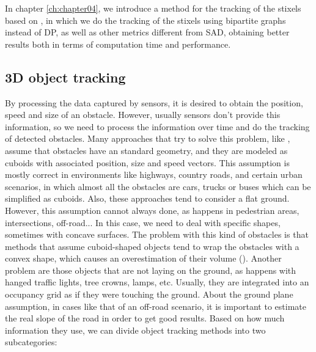 In chapter \ref{ch:chapter04}, we introduce a method for the tracking of the stixels based on \cite{gunyel2012stixels}, in which we do the tracking of the stixels using bipartite graphs instead of \ac{DP}, as well as other metrics different from \ac{SAD}, obtaining better results both in terms of computation time and performance.

\subsection{3D object tracking}\label{ch:chapter00_02_05}

By processing the data captured by sensors, it is desired to obtain the position, speed and size of an obstacle. However, usually sensors don't provide this information, so we need to process the information over time and do the tracking of detected obstacles. Many approaches that try to solve this problem, like \cite{danescu2012particle}, assume that obstacles have an standard geometry, and they are modeled as cuboids with associated position, size and speed vectors. This assumption is mostly correct in environments like highways, country roads, and certain urban scenarios, in which almost all the obstacles are cars, trucks or buses which can be simplified as cuboids. Also, these approaches tend to consider a flat ground.
However, this assumption cannot always done, as happens in pedestrian areas, intersections, off-road... In this case, we need to deal with specific shapes, sometimes with concave surfaces. The problem with this kind of obstacles is that methods that assume cuboid-shaped objects tend to wrap the obstacles with a convex shape, which causes an overestimation of their volume (\cite{broggi2013}). Another problem are those objects that are not laying on the ground, as happens with hanged traffic lights, tree crowns, lamps, etc. Usually, they are integrated into an occupancy grid as if they were touching the ground. About the ground plane assumption, in cases like that of an off-road scenario, it is important to estimate the real slope of the road in order to get good results.
Based on how much information they use, we can divide object tracking methods into two subcategories:
